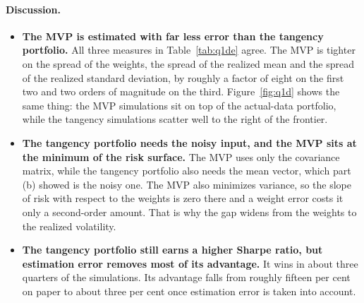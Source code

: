 \documentclass[11pt]{article}
\begin{document}
\paragraph{Discussion.}
\begin{itemize}
\setlength{\itemsep}{3pt}\setlength{\parskip}{0pt}

\item \textbf{The MVP is estimated with far less error than the tangency
portfolio.} All three measures in Table~\ref{tab:q1de} agree. The MVP is
tighter on the spread of the weights, the spread of the realized mean and the
spread of the realized standard deviation, by roughly a factor of eight on the
first two and two orders of magnitude on the third. Figure~\ref{fig:q1d} shows
the same thing: the MVP simulations sit on top of the actual-data portfolio,
while the tangency simulations scatter well to the right of the frontier.

\item \textbf{The tangency portfolio needs the noisy input, and the MVP sits
at the minimum of the risk surface.} The MVP uses only the covariance matrix,
while the tangency portfolio also needs the mean vector, which part (b) showed
is the noisy one. The MVP also minimizes variance, so the slope of risk with
respect to the weights is zero there and a weight error costs it only a
second-order amount. That is why the gap widens from the weights to the
realized volatility.

\item \textbf{The tangency portfolio still earns a higher Sharpe ratio, but
estimation error removes most of its advantage.} It wins in about three
quarters of the simulations. Its advantage falls from roughly fifteen per cent
on paper to about three per cent once estimation error is taken into account.

\end{itemize}
\end{document}
